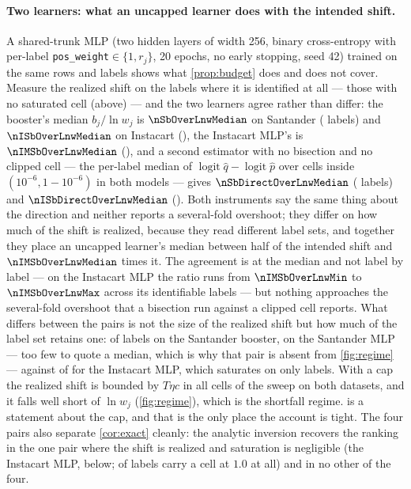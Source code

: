 \documentclass[sigconf,nonacm]{acmart}
\begin{document}
\paragraph{Two learners: what an uncapped learner does with the intended shift.} A shared-trunk MLP (two hidden layers of width 256, binary cross-entropy with per-label \texttt{pos\_weight}$\in\{1,r_j\}$, 20 epochs, no early stopping, seed 42) trained on the same rows and labels shows what \cref{prop:budget} does and does not cover. Measure the realized shift on the labels where it is identified at all --- those with no saturated cell (above) --- and the two learners agree rather than differ: the booster's median $b_j/\ln w_j$ is $\nSbOverLnwMedian$ on Santander (\nSnIdentShift{} labels) and $\nISbOverLnwMedian$ on Instacart (\nISnIdentShift), the Instacart MLP's is $\nIMSbOverLnwMedian$ (\nIMSnIdentShift), and a second estimator with no bisection and no clipped cell --- the per-label median of $\operatorname{logit}\hat q-\operatorname{logit}\hat p$ over cells inside $(10^{-6},1-10^{-6})$ in both models --- gives $\nSbDirectOverLnwMedian$ (\nSnDirectShift{} labels) and $\nISbDirectOverLnwMedian$ (\nISnDirectShift). Both instruments say the same thing about the direction and neither reports a several-fold overshoot; they differ on how much of the shift is realized, because they read different label sets, and together they place an uncapped learner's median between half of the intended shift and $\nIMSbOverLnwMedian$ times it. The agreement is at the median and not label by label --- on the Instacart MLP the ratio runs from $\nIMSbOverLnwMin$ to $\nIMSbOverLnwMax$ across its identifiable labels --- but nothing approaches the several-fold overshoot that a bisection run against a clipped cell reports. What differs between the pairs is not the size of the realized shift but how much of the label set retains one: \nSnIdentShift{} of \nnLabels{} labels on the Santander booster, \nMSnIdentShift{} on the Santander MLP --- too few to quote a median, which is why that pair is absent from \cref{fig:regime} --- against \nIMSnIdentShift{} of \nInLabels{} for the Instacart MLP, which saturates on only \nIMSnSatDroppedShift{} labels. With a cap the realized shift is bounded by $T\eta c$ in all \ncapN{} cells of the sweep on both datasets, and it falls well short of $\ln w_j$ (\cref{fig:regime}), which is the shortfall regime.  is a statement about the cap, and that is the only place the account is tight. The four pairs also separate \cref{cor:exact} cleanly: the analytic inversion recovers the ranking in the one pair where the shift is realized and saturation is negligible (the Instacart MLP, below; \nIMSnSatDroppedShift{} of \nInLabels{} labels carry a cell at $1.0$ at all) and in no other of the four.
\end{document}
